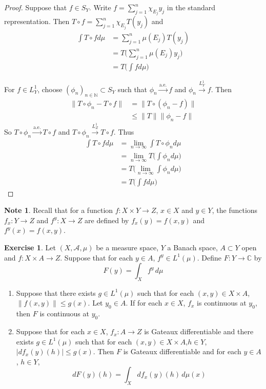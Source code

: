 \documentclass{book}
\theoremstyle{definition}
\newtheorem{note}[definition]{Note}
\newtheorem{ex}[definition]{Exercise}
\newcommand{\C}{\mathbb{C}}
\newcommand{\N}{\mathbb{N}}
\newcommand{\MA}{\mathcal{A}}
\newcommand{\lex}[1]{\label{ex:#1}}
\DeclareMathOperator*{\0}{\mbf{0}}
\DeclareMathOperator*{\1}{\mbf{1}}
\newcommand{\limn}{\lim \limits_{n \rightarrow \infty}}
\newcommand{\convt}[1]{\xrightarrow{\text{#1}}}
\newcommand{\conv}[1]{\xrightarrow{#1}}
\newcommand{\dmu}{\, d \mu}
\begin{document}
	\begin{proof}
	Suppose that $f \in S_Y$. Write $f = \sum\limits_{j=1}^n \chi_{E_j}y_j $ in the standard representation. Then $T \circ f = \sum\limits_{j=1}^n \chi_{E_j}T(y_j)$  and 
	\begin{align*}
	\int T \circ f d \mu 
	&= \sum\limits_{j=1}^n \mu(E_j)T(y_j) \\
	&= T \bigg(\sum\limits_{j=1}^n \mu(E_j)y_j \bigg) \\
	&= T \bigg( \int f d\mu \bigg)
	\end{align*}
	
	For $f \in L^1_Y$, choose $(\phi_n)_{n \in \N} \subset S_Y$ such that $\phi_n \convt{a.e.} f$ and $\phi_n \conv{L^1_Y} f$. Then 
	\begin{align*}
	\|T \circ \phi_n - T \circ f\| 
	&= \|T \circ (\phi_n - f)\| \\
	& \leq \|T\| \|\phi_n - f\|
	\end{align*}
	So $T \circ \phi_n \convt{a.e.} T \circ f$ and $T \circ \phi_n \conv{L^1_Z} T \circ f $. Thus 
	\begin{align*}
	\int T \circ f d\mu 
	&= \limn \int T \circ \phi_n d\mu \\
	&= \limn T \bigg( \int \phi_n d\mu \bigg) \\
	&= T \bigg( \limn \int \phi_n d\mu \bigg) \\
	&= T \bigg( \int f d\mu  \bigg)
	\end{align*}
	\end{proof}
	
	\begin{note}
	Recall that for a function $f:X \times Y \rightarrow Z$, $x \in X$ and $y \in Y$, the functions $f_x:Y \rightarrow Z$ and $f^y:X \rightarrow Z$ are defined by $f_x(y) = f(x,y)$ and $f^y(x) = f(x,y)$.
	\end{note}
	
	\begin{ex} \lex{00000} 
	Let $(X, \MA, \mu)$ be a measure space,  $Y$ a Banach space, $A \subset Y$ open and $f:X \times A \rightarrow Z$. Suppose that for each $y \in A$, $f^y \in L^1(\mu)$. Define $F: Y \rightarrow \C$ by 
	$$F(y) = \int_X f^y \dmu $$ 
	\begin{enumerate}
	\item Suppose that there exists $g \in L^1(\mu)$ such that for each $(x, y) \in X \times A$, $\|f(x,y)\| \leq g(x)$. Let $y_0 \in A$. If for each $x \in X$, $f_x$ is continuous at $y_0$, then $F$ is continuous at $y_0$. 
 	\item Suppose that for each $x \in X$, $f_x:A \rightarrow Z$ is Gateaux differentiable and there exists $g \in L^1(\mu)$ such that for each $(x, y) \in X \times A$,$h \in Y$,  $| df_x(y)(h) | \leq g(x)$. Then $F$ is Gateaux differentiable and for each $y \in A$, $h \in Y$, $$dF(y)(h) = \int_X df_x(y)(h) \dmu(x)$$
	\end{enumerate}
	\end{ex}
	
\end{document}
